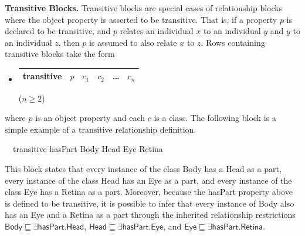 \documentclass[5p,authoryear]{elsarticle}
\newcommand{\myblock}[1]{\vspace{12pt}\noindent\textbf{#1}}
\begin{document}
\myblock{Transitive Blocks.} Transitive blocks are special cases of
relationship blocks where the object property is asserted to be
transitive. That is, if a property $p$ is declared to be transitive,
and $p$ relates an individual $x$ to an individual $y$ and $y$ to an
individual $z$, then $p$ is assumed to also relate $x$ to $z$. Rows
containing transitive blocks take the form
\begin{itemize}
\item[]
  \begin{tabular}{|l|l|l|l|l|l|}\hline \textsf{transitive} & $p$ & $c_1$
    & $c_2$ & \dots & $c_n$ \\ \hline
  \end{tabular} \hfill ($n \ge 2$)
\end{itemize}
where $p$ is an object property and each $c$ is a class.  The
following block is a simple example of a transitive relationship
definition.
\begin{tabbing}
  ~~\textsf{transitive} \textsf{hasPart} \textsf{Body}
  \textsf{Head} \textsf{Eye} \textsf{Retina}
\end{tabbing} 
This block states that every instance of the class Body has a Head as
a part, every instance of the class Head has an Eye as a part, and
every instance of the class Eye has a Retina as a part. Moreover,
because the \textsf{hasPart} property above is defined to be
transitive, it is possible to infer that every instance of Body also
has an Eye and a Retina as a part through the inherited relationship
restrictions $\textsf{Body} \sqsubseteq \exists \textsf{hasPart}
. \textsf{Head}$, $\textsf{Head} \sqsubseteq \exists \textsf{hasPart}
. \textsf{Eye}$, and $\textsf{Eye} \sqsubseteq \exists
\textsf{hasPart} . \textsf{Retina}$.
\end{document}
